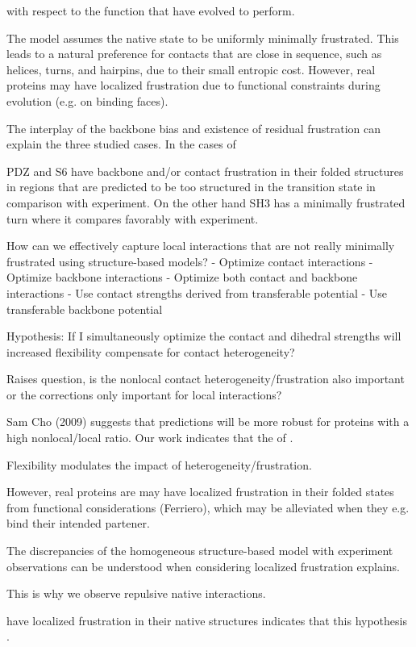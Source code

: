 \documentclass[preprint]{elsarticle}
\begin{document}
 with respect to the function that have
evolved to perform.

    The model assumes the native state to be uniformly minimally frustrated.
This leads to a natural preference for contacts that are close in sequence,
such as helices, turns, and hairpins, due to their small entropic cost. 
However, real proteins may have localized frustration due to functional
constraints during evolution (e.g. on binding faces).  

    The interplay of the backbone bias and existence of residual frustration
can explain the three studied cases. In the cases of 

    PDZ and S6 have backbone and/or contact frustration in their folded
structures in regions that are predicted to be too structured in the transition
state in comparison with experiment. On the other hand SH3 has a minimally
frustrated turn where it compares favorably with experiment.

    How can we effectively capture local interactions that are not really
minimally frustrated using structure-based models?
    - Optimize contact interactions
    - Optimize backbone interactions
    - Optimize both contact and backbone interactions
    - Use contact strengths derived from transferable potential
    - Use transferable backbone potential

Hypothesis: If I simultaneously optimize the contact and dihedral strengths
will increased flexibility compensate for contact heterogeneity?

    Raises question, is the nonlocal contact heterogeneity/frustration also
important or the corrections only important for local interactions? 

    Sam Cho (2009) suggests that predictions will be more robust for 
proteins with a high nonlocal/local ratio. Our work indicates that the 
of .

    Flexibility modulates the impact of heterogeneity/frustration.


    However, real proteins are may have localized frustration in their folded
states from functional considerations (Ferriero), which may be alleviated when
they e.g. bind their intended partener. 

    The discrepancies of the homogeneous structure-based model with experiment
observations can be understood when considering localized frustration explains.

This is why we observe repulsive native interactions.

 have localized frustration in their native 
structures indicates that this hypothesis .  
\end{document}
